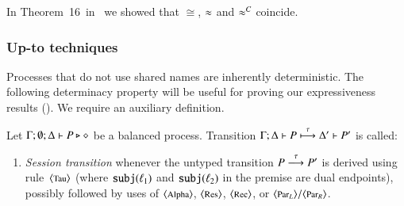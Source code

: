 {\noi In Theorem~16~in~\cite{characteristic_bis}
we showed that
$\cong$, $\approx$ and $\approx^C$ coincide.


%
%
%


\subsubsection{Up-to techniques}

\noi Processes that do not use shared names are inherently deterministic. 
The following determinacy property will be useful 
for proving our expressiveness results ().
We require an auxiliary definition.

\begin{definition}\myrm
\label{def:dettrans}
	Let  $\Gamma; \emptyset; \Delta \vdash P \triangleright \diamond$ be a balanced \HOp process. 
	Transition $\Gamma; \Delta \vdash P \stackrel{\tau}{\longmapsto} \Delta' \vdash P'$ is called:
	\begin{enumerate}[$-$]
		\item	{\em Session transition}
				whenever the untyped transition $P \stackrel{\tau}{\longrightarrow} P'$ 
				is derived using  rule~${\footnotesize \langle \textrm{Tau} \rangle}$ 
				(where $\mathtt{subj}(\ell_1)$ and $\mathtt{subj}(\ell_2)$ in the premise are dual endpoints), 
				possibly followed by uses of
				${\footnotesize \langle \textrm{Alpha} \rangle}$, ${\footnotesize \langle \textrm{Res} \rangle}$, ${\footnotesize \langle \textrm{Rec} \rangle}$, or ${\footnotesize \langle \textrm{Par${}_L$} \rangle}/
				{\footnotesize \langle \textrm{Par${}_R$} \rangle}$.
		

\end{enumerate}
\end{definition}}
